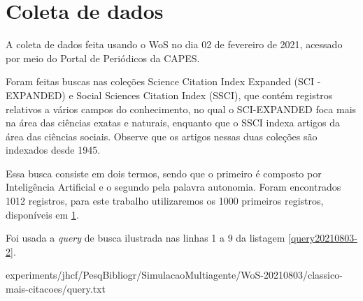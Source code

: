 \section{Coleta de dados}

A coleta de dados feita usando o WoS no dia 02 de fevereiro de 2021, acessado por meio do Portal de Periódicos da CAPES.

Foram feitas buscas nas coleções Science  Citation  Index  Expanded (SCI -EXPANDED) e Social  Sciences  Citation  Index (SSCI), que contém registros relativos a vários campos do conhecimento, no qual o SCI-EXPANDED foca mais na área das ciências exatas e naturais, enquanto que o SSCI indexa artigos da área das ciências sociais. Observe que os artigos nessas duas coleções são indexados desde 1945. 

Essa busca consiste em dois termos, sendo que o primeiro é composto por Inteligência Artificial e o segundo pela palavra autonomia. Foram encontrados 1012 registros, para este trabalho utilizaremos os 1000 primeiros registros, disponíveis em \ref{}.

Foi usada a \textit{query} de busca ilustrada nas linhas 1 a 9 da listagem \ref{query20210803-2}.


{experiments/jhcf/PesqBibliogr/SimulacaoMultiagente/WoS-20210803/classico-mais-citacoes/query.txt}
